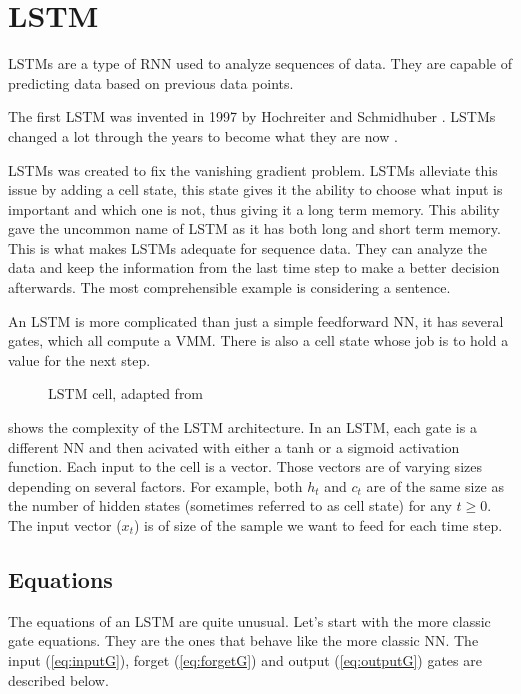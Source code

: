 \section{\acl{LSTM}}\label{sec:lstm}
\acfp{LSTM} are a type of \ac{RNN} used to analyze sequences of data. They are capable of predicting data based on previous data points.

The first \ac{LSTM} was invented in 1997 by Hochreiter and Schmidhuber \cite{firstLSTM}. \acp{LSTM} changed a lot through the years to become what they are now \cite{improvLSTM}.

\acp{LSTM} was created to fix the vanishing gradient problem. \acp{LSTM} alleviate this issue by adding a cell state, this state gives it the ability to choose what input is important and which one is not, thus giving it a long term memory. This ability gave the uncommon name of \acl{LSTM} as it has both long and short term memory. This is what makes \acp{LSTM} adequate for sequence data. They can analyze the data and keep the information from the last time step to make a better decision afterwards. The most comprehensible example is considering a sentence.

An \ac{LSTM} is more complicated than just a simple feedforward \acl{NN}, it has several gates, which all compute a \ac{VMM}. There is also a cell state whose job is to hold a value for the next step.

\begin{figure}[H]
  \centering
  
  \caption{\acs{LSTM} cell, adapted from \cite{wikiLSTM}}
  \label{fig:lstmCell}
\end{figure}

 shows the complexity of the \ac{LSTM} architecture. In an \ac{LSTM}, each gate is a different \ac{NN} and then acivated with either a \ac{tanh} or a sigmoid activation function. Each input to the cell is a vector.
Those vectors are of varying sizes depending on several factors. For example, both $h_t$ and $c_t$ are of the same size as the number of hidden states (sometimes referred to as cell state) for any $t\geq 0$.
The input vector ($x_t$) is of size of the sample we want to feed for each time step.

\subsection{Equations}

The equations of an LSTM are quite unusual.
Let's start with the more classic gate equations. They are the ones that behave like the more classic \ac{NN}.
The input (\cref{eq:inputG}), forget (\cref{eq:forgetG}) and output (\cref{eq:outputG}) gates are described below.


